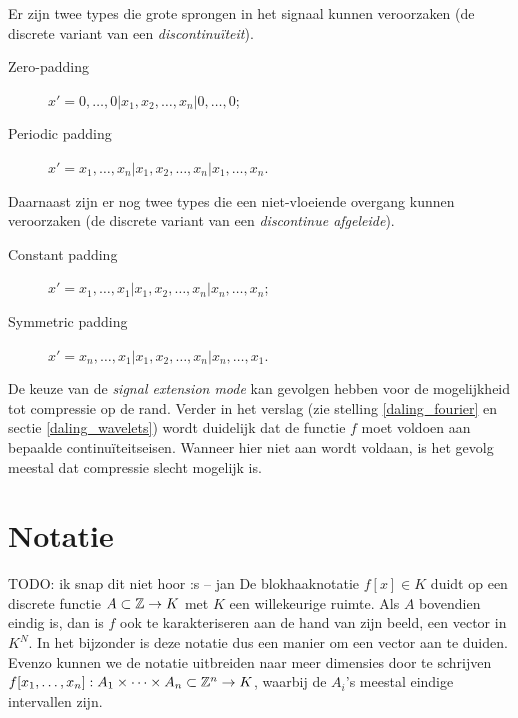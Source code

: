 Er zijn twee types die grote sprongen in het signaal kunnen veroorzaken (de discrete variant van een \emph{discontinu\"iteit}).
\begin{description}
\item[Zero-padding] $x' = 0, \ldots, 0| x_1, x_2, \ldots, x_n| 0, \ldots, 0$;
\item[Periodic padding] $x' = x_1, \ldots, x_n| x_1, x_2, \ldots, x_n| x_1, \ldots, x_n$.
\end{description}

Daarnaast zijn er nog twee types die een niet-vloeiende overgang kunnen veroorzaken (de discrete variant van een \emph{discontinue afgeleide}).
\begin{description}
\item[Constant padding] $x' = x_1, \ldots, x_1| x_1, x_2, \ldots, x_n| x_n, \ldots, x_n$;
\item[Symmetric padding] $x' = x_n, \ldots, x_1| x_1, x_2, \ldots, x_n| x_n, \ldots, x_1$.
\end{description}

De keuze van de \emph{signal extension mode} kan gevolgen hebben voor de mogelijkheid tot compressie op de rand. Verder in het verslag (zie stelling \ref{daling_fourier} en sectie \ref{daling_wavelets}) wordt duidelijk dat de functie $f$ moet voldoen aan bepaalde continu\"iteitseisen. Wanneer hier niet aan wordt voldaan, is het gevolg meestal dat compressie slecht mogelijk is.

\section{Notatie}
TODO: ik snap dit niet hoor :s -- jan
De blokhaaknotatie $f[x]\in K$ duidt op een discrete functie $A\subset \mathbb{Z}\to K$ met $K$ een willekeurige ruimte.
Als $A$ bovendien eindig is, dan is $f$ ook te karakteriseren aan de hand van zijn beeld, een vector in $K^{N}$.
In het bijzonder is deze notatie dus een manier om een vector aan te duiden.
Evenzo kunnen we de notatie uitbreiden naar meer dimensies door te schrijven
$f[x_1,\ldots,x_n] : A_1\times \cdots \times A_n\subset \mathbb{Z}^n \to K$, waarbij de $A_i$'s meestal eindige intervallen zijn. 

